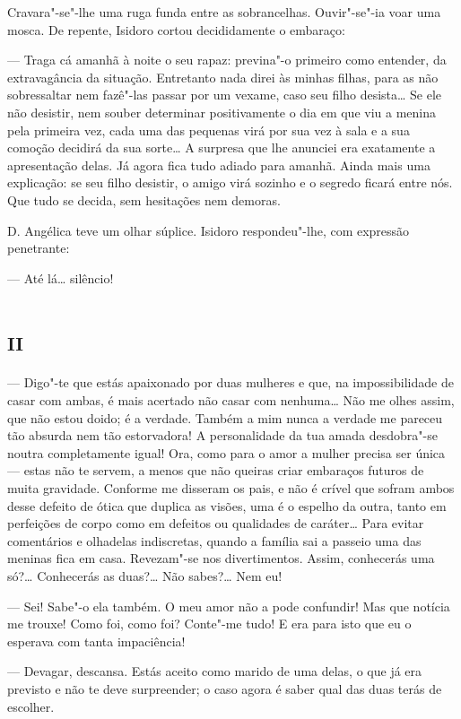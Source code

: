 Cravara"-se"-lhe uma ruga funda entre as sobrancelhas. Ouvir"-se"-ia voar
uma mosca. De repente, Isidoro cortou decididamente o embaraço:

--- Traga cá amanhã à noite o seu rapaz: previna"-o primeiro como
entender, da extravagância da situação. Entretanto nada direi às minhas
filhas, para as não sobressaltar nem fazê"-las passar por um vexame, caso
seu filho desista\ldots{} Se ele não desistir, nem souber determinar
positivamente o dia em que viu a menina pela primeira vez, cada uma das
pequenas virá por sua vez à sala e a sua comoção decidirá da sua
sorte\ldots{} A surpresa que lhe anunciei era exatamente a apresentação
delas. Já agora fica tudo adiado para amanhã. Ainda mais uma explicação:
se seu filho desistir, o amigo virá sozinho e o segredo ficará entre
nós. Que tudo se decida, sem hesitações nem demoras.

D. Angélica teve um olhar súplice. Isidoro respondeu"-lhe, com expressão
penetrante:

--- Até lá\ldots{} silêncio!

\section*{\textsc{ii}}

--- Digo"-te que estás apaixonado por duas mulheres e que, na
impossibilidade de casar com ambas, é mais acertado não casar com
nenhuma\ldots{} Não me olhes assim, que não estou doido; é a verdade. Também
a mim nunca a verdade me pareceu tão absurda nem tão estorvadora! A
personalidade da tua amada desdobra"-se noutra completamente igual! Ora,
como para o amor a mulher precisa ser única --- estas não te servem, a
menos que não queiras criar embaraços futuros de muita gravidade.
Conforme me disseram os pais, e não é crível que sofram ambos desse
defeito de ótica que duplica as visões, uma é o espelho da outra, tanto
em perfeições de corpo como em defeitos ou qualidades de caráter\ldots{} Para
evitar comentários e olhadelas indiscretas, quando a família sai a
passeio uma das meninas fica em casa. Revezam"-se nos divertimentos.
Assim, conhecerás uma só?\ldots{} Conhecerás as duas?\ldots{} Não sabes?\ldots{} Nem
eu!

--- Sei! Sabe"-o ela também. O meu amor não a pode confundir! Mas que
notícia me trouxe! Como foi, como foi? Conte"-me tudo! E era para isto
que eu o esperava com tanta impaciência!

--- Devagar, descansa. Estás aceito como marido de uma delas, o que já
era previsto e não te deve surpreender; o caso agora é saber qual das
duas terás de escolher.

